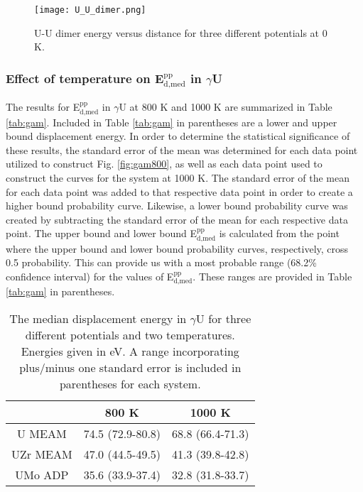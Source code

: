 \documentclass[review]{elsarticle}
\begin{document}
\begin{figure}[h]
 \centering
 \texttt{[image: U\_U\_dimer.png]} 
 \caption{U-U dimer energy versus distance for three different potentials at 0 K.}
 \label{fig:dimer}
\end{figure}


\subsubsection{Effect of temperature on E$^{\textrm{pp}}_{\textrm{d,med}}$ in $\gamma$U}

The results for E$^{\textrm{pp}}_{\textrm{d,med}}$ in $\gamma$U at 800 K and 1000 K are summarized in Table \ref{tab:gam}. Included in Table \ref{tab:gam} in parentheses are a lower and upper bound displacement energy. In order to determine the statistical significance of these results, the standard error of the mean was determined for each data point utilized to construct Fig. \ref{fig:gam800}, as well as each data point used to construct the curves for the system at 1000 K. The standard error of the mean for each data point was added to that respective data point in order to create a higher bound probability curve. Likewise, a lower bound probability curve was created by subtracting the standard error of the mean for each respective data point. The upper bound and lower bound E$^{\textrm{pp}}_{\textrm{d,med}}$ is calculated from the point where the upper bound and lower bound probability curves, respectively, cross 0.5 probability. This can provide us with a most probable range (68.2\% confidence interval) for the values of E$^{\textrm{pp}}_{\textrm{d,med}}$. These ranges are provided in Table \ref{tab:gam} in parentheses. 

\begin{table}[h]
\caption{The median displacement energy in $\gamma$U for three different potentials and two temperatures. Energies given in eV. A range incorporating plus/minus one standard error is included in parentheses for each system.} \label{tab:gam}
\begin{center}
\begin{tabular}{|c|c|c|}
	\hline
	& 800 K & 1000 K \\
	 \hline
	 U MEAM & 74.5 (72.9-80.8) & 68.8 (66.4-71.3) \\
	 UZr MEAM & 47.0 (44.5-49.5) & 41.3 (39.8-42.8) \\
	 UMo ADP & 35.6 (33.9-37.4) & 32.8 (31.8-33.7) \\
	 \hline
\end{tabular}
\end{center}
\label{default}
\end{table}
\end{document}
